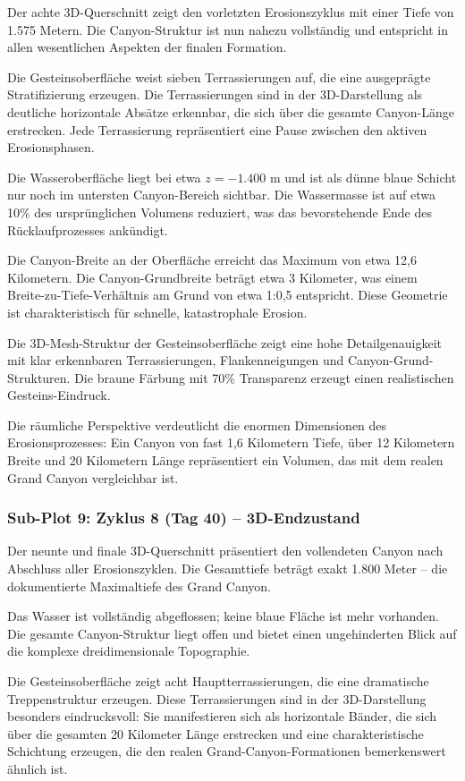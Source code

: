 Der achte 3D-Querschnitt zeigt den vorletzten Erosionszyklus mit einer Tiefe von 1.575 Metern. Die Canyon-Struktur ist nun nahezu vollständig und entspricht in allen wesentlichen Aspekten der finalen Formation.

Die Gesteinsoberfläche weist sieben Terrassierungen auf, die eine ausgeprägte Stratifizierung erzeugen. Die Terrassierungen sind in der 3D-Darstellung als deutliche horizontale Absätze erkennbar, die sich über die gesamte Canyon-Länge erstrecken. Jede Terrassierung repräsentiert eine Pause zwischen den aktiven Erosionsphasen.

Die Wasseroberfläche liegt bei etwa $z = -1.400$ m und ist als dünne blaue Schicht nur noch im untersten Canyon-Bereich sichtbar. Die Wassermasse ist auf etwa 10\% des ursprünglichen Volumens reduziert, was das bevorstehende Ende des Rücklaufprozesses ankündigt.

Die Canyon-Breite an der Oberfläche erreicht das Maximum von etwa 12,6 Kilometern. Die Canyon-Grundbreite beträgt etwa 3 Kilometer, was einem Breite-zu-Tiefe-Verhältnis am Grund von etwa 1:0,5 entspricht. Diese Geometrie ist charakteristisch für schnelle, katastrophale Erosion.

Die 3D-Mesh-Struktur der Gesteinsoberfläche zeigt eine hohe Detailgenauigkeit mit klar erkennbaren Terrassierungen, Flankenneigungen und Canyon-Grund-Strukturen. Die braune Färbung mit 70\% Transparenz erzeugt einen realistischen Gesteins-Eindruck.

Die räumliche Perspektive verdeutlicht die enormen Dimensionen des Erosionsprozesses: Ein Canyon von fast 1,6 Kilometern Tiefe, über 12 Kilometern Breite und 20 Kilometern Länge repräsentiert ein Volumen, das mit dem realen Grand Canyon vergleichbar ist.

\subsubsection*{Sub-Plot 9: Zyklus 8 (Tag 40) -- 3D-Endzustand}

Der neunte und finale 3D-Querschnitt präsentiert den vollendeten Canyon nach Abschluss aller Erosionszyklen. Die Gesamttiefe beträgt exakt 1.800 Meter -- die dokumentierte Maximaltiefe des Grand Canyon.

Das Wasser ist vollständig abgeflossen; keine blaue Fläche ist mehr vorhanden. Die gesamte Canyon-Struktur liegt offen und bietet einen ungehinderten Blick auf die komplexe dreidimensionale Topographie.

Die Gesteinsoberfläche zeigt acht Hauptterrassierungen, die eine dramatische Treppenstruktur erzeugen. Diese Terrassierungen sind in der 3D-Darstellung besonders eindrucksvoll: Sie manifestieren sich als horizontale Bänder, die sich über die gesamten 20 Kilometer Länge erstrecken und eine charakteristische Schichtung erzeugen, die den realen Grand-Canyon-Formationen bemerkenswert ähnlich ist.

